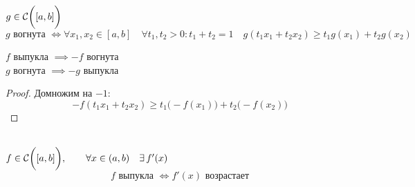 \begin{definition}
    $ g \in \mathcal{C} \bigg( {[a, b]} \bigg)  $
    $$ g \text{ вогнута } \iff \forall x_1 , x_2 \in [a, b] \quad \forall t_1, t_2 > 0 : t_1 + t_2 = 1 \quad g(t_1x_1 + t_2x_2) \ge t_1g(x_1) + t_2g(x_2) $$
\end{definition}

\begin{theorem}
	$ f $ выпукла $ \implies -f $ вогнута \\
    $ g $ вогнута $ \implies -g $ выпукла
\end{theorem}

\begin{proof}
    Домножим  на $ -1 $:
    $$ -f(t_1x_1 + t_2x_2) \ge t_1 \big( -f(x_1) \big) + t_2 \big( -f(x_2) \big) $$
\end{proof}

\begin{theorem}
    \hfill \\
    $ f \in \mathcal{C} \bigg( {[a, b]} \bigg) , \qquad \forall x \in (a, b) \quad \exists\, f'(x) $
    $$ f \text{ выпукла } \iff f'(x) \text{ возрастает} $$
\end{theorem}

